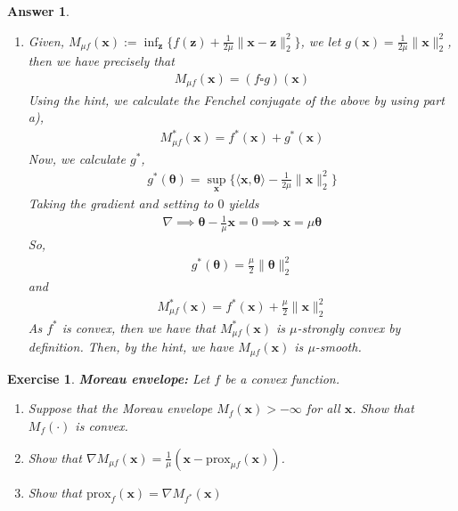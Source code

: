 \documentclass[12pt]{article}
\theoremstyle{colon}
\newtheorem{exercise}{Exercise}
\newtheorem*{answer}{Answer}
\begin{document}
\begin{answer}
\begin{enumerate}[label=\alph*)]
		\item Given, $M_{\mu f}(\bm{x}) := \inf_{\bm{z}} \{ f(\bm{z}) + \frac{1}{2\mu} \lVert \bm{x} - \bm{z} \rVert_2^2 \}$, we let $g(\bm{x}) = \frac{1}{2\mu} \lVert \bm{x}\rVert_2^2$, then we have precisely that
			\begin{gather*}
				M_{\mu f}(\bm{x}) = (f \square g)(\bm{x})
			\end{gather*}
			Using the hint, we calculate the Fenchel conjugate of the above by using part a),
			\begin{gather*}
				M_{\mu f}^*(\bm{x}) = f^*(\bm{x}) + g^*(\bm{x})
			\end{gather*}
			Now, we calculate $g^*$,
			\begin{gather*}
				g^*(\bm{\theta}) = \sup_{\bm{x}} \{ \langle \bm{x}, \bm{\theta} \rangle - \frac{1}{2\mu} \lVert \bm{x} \rVert_2^2 \}
			\end{gather*}
			Taking the gradient and setting to $0$ yields
			\begin{gather*}
				\nabla \implies \bm{\theta} - \frac{1}{\mu} \bm{x} = 0 \implies \bm{x} = \mu \bm{\theta}
			\end{gather*}
			So,
			\begin{gather*}
				g^*(\bm{\theta}) = \frac{\mu}{2} \lVert \bm{\theta} \rVert_2^2
			\end{gather*}
			and
			\begin{gather*}
				M_{\mu f}^*(\bm{x}) = f^*(\bm{x}) + \frac{\mu}{2} \lVert \bm{x} \rVert_2^2
			\end{gather*}
			As $f^*$ is convex, then we have that $M_{\mu f}^*(\bm{x})$ is $\mu$-strongly convex by definition. Then, by the hint, we have $M_{\mu f}(\bm{x})$ is $\mu$-smooth.
	\end{enumerate}
\end{answer}

\clearpage

\begin{exercise}
	\textbf{Moreau envelope:} Let $f$ be a convex function.
	\begin{enumerate}[label=\alph*)]
		\item Suppose that the Moreau envelope $M_f(\bm{x}) > -\infty$ for all $\bm{x}$. Show that $M_f(\cdot)$ is convex.
		\item Show that $\nabla M_{\mu f}(\bm{x}) = \frac{1}{\mu} (\bm{x} - \text{prox}_{\mu f}(\bm{x}))$.
		\item Show that $\text{prox}_f(\bm{x}) = \nabla M_{f^*} (\bm{x})$
	\end{enumerate}
\end{exercise}
\end{document}
